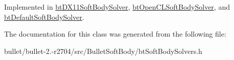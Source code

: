 Implemented in \hyperlink{classbt_d_x11_soft_body_solver_a14550caa4b6eb1be4c47cef4a4b40336}{bt\+D\+X11\+Soft\+Body\+Solver}, \hyperlink{classbt_open_c_l_soft_body_solver_ae37f7bd6f4ab0c4b8eb26fb1c104644a}{bt\+Open\+C\+L\+Soft\+Body\+Solver}, and \hyperlink{classbt_default_soft_body_solver_a28c27dd170396900b6e79379d5781610}{bt\+Default\+Soft\+Body\+Solver}.



The documentation for this class was generated from the following file\+:\begin{DoxyCompactItemize}
\item 
bullet/bullet-\/2.-\/r2704/src/\+Bullet\+Soft\+Body/bt\+Soft\+Body\+Solvers.\+h\end{DoxyCompactItemize}
